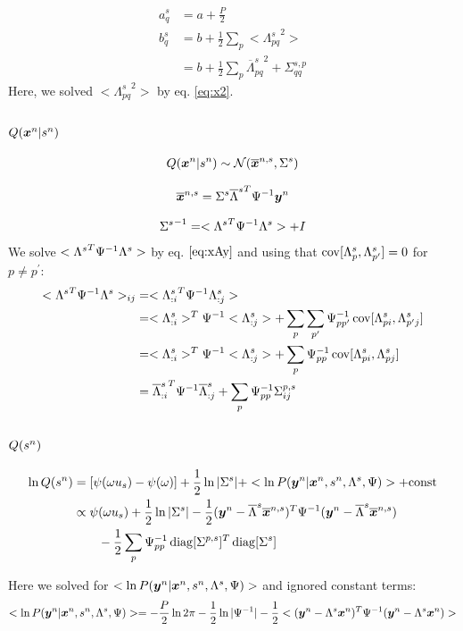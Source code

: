 \documentclass[a4paper]{article}
\begin{document}
\begin{align}
a_q^s&=a+\frac{P}{2} \\
b_q^s&=b+\frac{1}{2}\sum_p<{\Lambda^s_{pq}}^2> \\
&=b+\frac{1}{2}\sum_p {\overline{\Lambda}_{pq}^s}^2+\Sigma_{qq}^{s,p}
\end{align}
Here, we solved $<{\Lambda^s_{pq}}^2>$ by eq. \ref{eq:x2}.

\subsection{$Q(\boldsymbol{x}^n|s^n)$}
\begin{align}
  Q(\boldsymbol{x}^n|s^n)\sim\mathcal{N}(\overline{\boldsymbol{x}}^{n,s},\Sigma^s)
\end{align}

\begin{align}
  \overline{\boldsymbol{x}}^{n,s}=\Sigma^s{\overline{\Lambda}^s}^T\Psi^{-1}\boldsymbol{y}^n
\end{align}

\begin{align}
  {\Sigma^s}^{-1}=<{\Lambda^s}^T \Psi^{-1} \Lambda^s>+I
\end{align}
We solve $<{\Lambda^s}^T \Psi^{-1} \Lambda^s>$ by eq. $\ref{eq:xAy}$ and using that $\operatorname{cov}[\Lambda^s_p,\Lambda^s_{p^\prime}]=0$ for $p\ne p^\prime$:
\begin{align}
  <{\Lambda^s}^T \Psi^{-1} \Lambda^s>_{ij}&=<{\Lambda^s_{:i}}^T \Psi^{-1} \Lambda^s_{:j}> \\
  &=<\Lambda^s_{:i}>^T\Psi^{-1} <\Lambda^s_{:j}>+\sum_p\sum_{p^\prime} \Psi^{-1}_{pp^\prime}\operatorname{cov}[\Lambda^s_{pi},\Lambda^s_{p^\prime j}] \\
  &=<\Lambda^s_{:i}>^T\Psi^{-1} <\Lambda^s_{:j}>+\sum_p \Psi^{-1}_{pp}\operatorname{cov}[\Lambda^s_{pi},\Lambda^s_{pj}] \\
  &={\overline{\Lambda}^s_{:i}}^T\Psi^{-1} \overline{\Lambda}^s_{:j}+\sum_p \Psi^{-1}_{pp}\Sigma^{p,s}_{ij}
\end{align}

\subsection{$Q(s^n)$}
\begin{align}
  \ln Q(s^n)
  &=\left[\psi(\omega u_s)-\psi(\omega)\right]+\frac{1}{2}\ln |\Sigma^s|+<\ln P(\boldsymbol{y}^n|\boldsymbol{x}^n,s^n,\Lambda^s,\Psi)>+\text{const} \\
  &\propto \psi(\omega u_s)+\frac{1}{2}\ln|\Sigma^s|-\frac{1}{2}(\boldsymbol{y}^n-\overline{\Lambda}^s\overline{\boldsymbol{x}}^{n,s})^T\Psi^{-1}(\boldsymbol{y}^n-\overline{\Lambda}^s\overline{\boldsymbol{x}}^{n,s}) \\
  &\qquad-\frac{1}{2}\sum_p \Psi^{-1}_{pp}\operatorname{diag}[\Sigma^{p,s}]^T\operatorname{diag}[\Sigma^s]
\end{align}

Here we solved for $<\ln P(\boldsymbol{y}^n|\boldsymbol{x}^n,s^n,\Lambda^s,\Psi)>$ and ignored constant terms:
\begin{align}
<\ln P(\boldsymbol{y}^n|\boldsymbol{x}^n,s^n,\Lambda^s,\Psi)>=-\frac{P}{2}\ln 2\pi-\frac{1}{2}\ln|\Psi^{-1}|-\frac{1}{2}<(\boldsymbol{y}^n-\Lambda^s\boldsymbol{x}^n)^T\Psi^{-1}(\boldsymbol{y}^n-\Lambda^s\boldsymbol{x}^n)>
\end{align}
\end{document}
